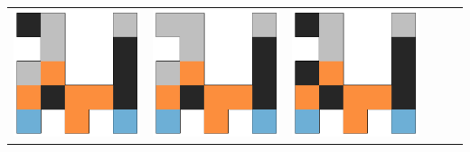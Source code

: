\begin{tabular}{cccccc}
    \hline \rule{0pt}{9ex}  
    \includegraphics[scale=0.1]{images/top_designs/carrier/ga/exp2/gen29_ind0} &
    \includegraphics[scale=0.1]{images/top_designs/carrier/ga/exp2/gen29_ind1} &
    \includegraphics[scale=0.1]{images/top_designs/carrier/ga/exp2/gen29_ind2} &

\end{tabular}
